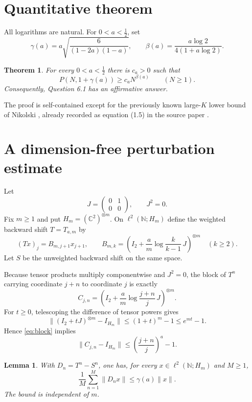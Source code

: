 \documentclass[10pt]{article}
\newtheorem{theorem}{Theorem}
\newtheorem{lemma}{Lemma}
\newcommand{\C}{\mathbb C}
\newcommand{\N}{\mathbb N}
\begin{document}
\section{Quantitative theorem}

All logarithms are natural.  For $0<a<\tfrac12$, set
\[
 \gamma(a)=a\sqrt{\frac{6}{(1-2a)(1-a)}},
 \qquad
 \beta(a)=\frac{a\log2}{4(1+a\log2)}.
\]

\begin{theorem}\label{thm:quant}
For every $0<a<\tfrac12$ there is $c_a>0$ such that
\[
 P(N,1+\gamma(a))\ge c_a N^{\beta(a)}
 \qquad(N\ge1).
\]
Consequently, Question 6.1 has an affirmative answer.
\end{theorem}

The proof is self-contained except for the previously known large-$K$ lower
bound of Nikolski \cite{Nikolski}, already recorded as equation (1.5) in the
source paper \cite{CTY}.

\section{A dimension-free perturbation estimate}

Let
\[
 J=\begin{pmatrix}0&1\\0&0\end{pmatrix},\qquad J^2=0.
\]
Fix $m\ge1$ and put $H_m=(\C^2)^{\otimes m}$.  On
$\ell^2(\N;H_m)$ define the weighted backward shift $T=T_{a,m}$ by
\[
 (Tx)_j=B_{m,j+1}x_{j+1},\qquad
 B_{m,k}=\left(I_2+\frac{a}{m}\log\frac{k}{k-1}\,J\right)^{\otimes m}
 \quad(k\ge2).
\]
Let $S$ be the unweighted backward shift on the same space.

Because tensor products multiply componentwise and $J^2=0$, the block of
$T^n$ carrying coordinate $j+n$ to coordinate $j$ is exactly
\begin{equation}\label{eq:block}
 C_{j,n}=\left(I_2+\frac{a}{m}\log\frac{j+n}{j}\,J\right)^{\otimes m}.
\end{equation}
For $t\ge0$, telescoping the difference of tensor powers gives
\[
 \|(I_2+tJ)^{\otimes m}-I_{H_m}\|
 \le (1+t)^m-1\le e^{mt}-1.
\]
Hence \eqref{eq:block} implies
\begin{equation}\label{eq:blockdiff}
 \|C_{j,n}-I_{H_m}\|
 \le \left(\frac{j+n}{j}\right)^a-1.
\end{equation}

\begin{lemma}\label{lem:average}
With $D_n=T^n-S^n$, one has, for every $x\in\ell^2(\N;H_m)$ and $M\ge1$,
\[
 \frac1M\sum_{n=1}^M\|D_nx\|\le\gamma(a)\|x\|.
\]
The bound is independent of $m$.
\end{lemma}
\end{document}
